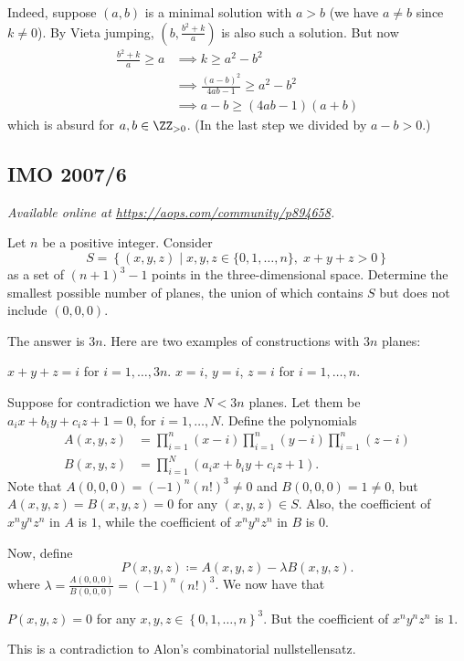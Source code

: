 \documentclass[11pt]{scrartcl}
\begin{document}
Indeed, suppose $(a, b)$ is a minimal solution with $a > b$
(we have $a \neq b$ since $k \neq 0$).
By Vieta jumping, $(b, \frac{b^2+k}{a})$ is also such a solution.
But now
\begin{align*}
  \frac{b^2+k}{a} \ge a &\implies k \ge a^2 - b^2 \\
  &\implies \frac{(a-b)^2}{4ab-1} \ge a^2-b^2 \\
  &\implies a-b \ge (4ab-1)(a+b)
\end{align*}
which is absurd for $a,b \in \ZZ_{>0}$.
(In the last step we divided by $a-b > 0$.)
\pagebreak

\subsection{IMO 2007/6}
\textsl{Available online at \url{https://aops.com/community/p894658}.}
\begin{mdframed}[style=mdpurplebox,frametitle={Problem statement}]
Let $n$ be a positive integer.
Consider
\[ S = \left\{ (x,y,z) \mid
  x,y,z \in \{ 0, 1, \dots, n\}, \;
  x+y+z > 0 \right\} \]
as a set of $(n+1)^3-1$ points in the three-dimensional space.
Determine the smallest possible number of planes,
the union of which contains $S$ but does not include $(0,0,0)$.
\end{mdframed}
The answer is $3n$.
Here are two examples of constructions with $3n$ planes:
\begin{itemize}
  \ii $x+y+z=i$ for $i=1,\dots,3n$.
  \ii $x=i$, $y=i$, $z=i$ for $i=1,\dots,n$.
\end{itemize}
Suppose for contradiction we have $N < 3n$ planes.
Let them be $a_i x + b_i y + c_i z + 1 = 0$, for $i = 1, \dots, N$.
Define the polynomials
\begin{align*}
  A(x,y,z) &= \prod_{i=1}^n (x-i) \prod_{i=1}^n (y-i) \prod_{i=1}^n (z-i) \\
  B(x,y,z) &= \prod_{i=1}^N \left( a_i x + b_i y + c_i z + 1 \right).
\end{align*}
Note that $A(0,0,0) = (-1)^n  (n!)^3 \neq 0$
and $B(0,0,0) =  1 \neq 0$,
but $A(x,y,z) = B(x,y,z) = 0$ for any $(x,y,z) \in S$.
Also, the coefficient of $x^n y^n z^n$ in $A$ is $1$,
while the coefficient of $x^n y^n z^n$ in $B$ is $0$.

Now, define
\[ P(x,y,z) \coloneqq A(x,y,z) - \lambda  B(x,y,z). \]
where $\lambda = \frac{A(0,0,0)}{B(0,0,0)} = (-1)^{n} (n!)^3$.
We now have that
\begin{itemize}
  \ii $P(x,y,z) = 0$ for any $x,y,z \in \left\{ 0,1,\dots,n \right\}^3$.
  \ii But the coefficient of $x^n y^n z^n$ is $1$.
\end{itemize}
This is a contradiction to Alon's combinatorial nullstellensatz.
\pagebreak
\end{document}
